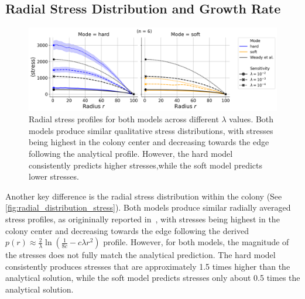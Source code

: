 \documentclass[conference]{IEEEtran}
\begin{document}
\subsection{Radial Stress Distribution and Growth Rate}

\begin{figure}
    \centering
    \includegraphics[width=\linewidth]{figures/comparison_plots/combined_stress_shared.png}
    \caption{Radial stress profiles for both models across different $\lambda$ values. Both models produce similar qualitative stress distributions, with stresses being highest in the colony center and decreasing towards the edge following the analytical profile. However, the hard model consistently predicts higher stresses,while the soft model predicts lower stresses.}
    \label{fig:radial_distribution_stress}
\end{figure}

Another key difference is the radial stress distribution within the colony (See \autoref{fig:radial_distribution_stress}). Both models produce similar radially averaged stress profiles, as origininally reported in~\cite{Weady2024}, with stresses being highest in the colony center and decreasing towards the edge following the derived $p(r) \approx \frac{2}{\lambda} \ln\left(\frac{1}{8 c} - c\lambda r^2 \right)$ profile. However, for both models, the magnitude of the stresses does not fully match the analytical prediction. The hard model consistently produces stresses that are approximately 1.5 times higher than the analytical solution, while the soft model predicts stresses only about 0.5 times the analytical solution.
\end{document}
